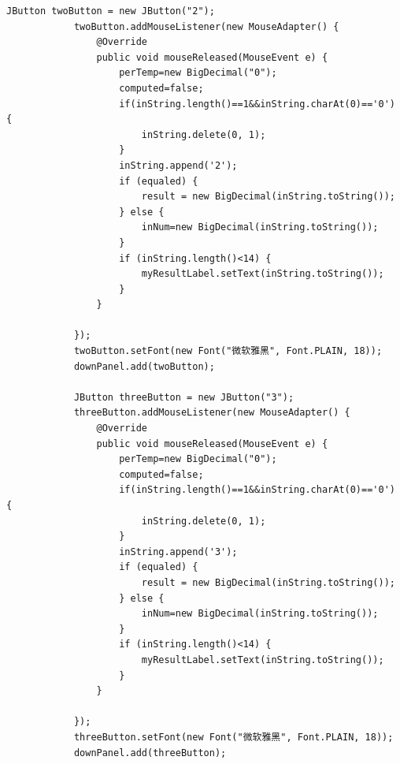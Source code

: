 \documentclass{ctexart}
\begin{document}
\begin{lstlisting}[caption=冗杂的代码]
            JButton twoButton = new JButton("2");
            twoButton.addMouseListener(new MouseAdapter() {
                @Override
                public void mouseReleased(MouseEvent e) {
                    perTemp=new BigDecimal("0");
                    computed=false;
                    if(inString.length()==1&&inString.charAt(0)=='0') {
                        inString.delete(0, 1);
                    }
                    inString.append('2');
                    if (equaled) {
                        result = new BigDecimal(inString.toString());		
                    } else {
                        inNum=new BigDecimal(inString.toString());
                    }
                    if (inString.length()<14) {
                        myResultLabel.setText(inString.toString());
                    }
                }
            
            });
            twoButton.setFont(new Font("微软雅黑", Font.PLAIN, 18));
            downPanel.add(twoButton);
            
            JButton threeButton = new JButton("3");
            threeButton.addMouseListener(new MouseAdapter() {
                @Override
                public void mouseReleased(MouseEvent e) {
                    perTemp=new BigDecimal("0");
                    computed=false;
                    if(inString.length()==1&&inString.charAt(0)=='0') {
                        inString.delete(0, 1);
                    }
                    inString.append('3');
                    if (equaled) {
                        result = new BigDecimal(inString.toString());		
                    } else {
                        inNum=new BigDecimal(inString.toString());
                    }
                    if (inString.length()<14) {
                        myResultLabel.setText(inString.toString());
                    }
                }
            
            });
            threeButton.setFont(new Font("微软雅黑", Font.PLAIN, 18));
            downPanel.add(threeButton);
            

\end{lstlisting}
\end{document}
